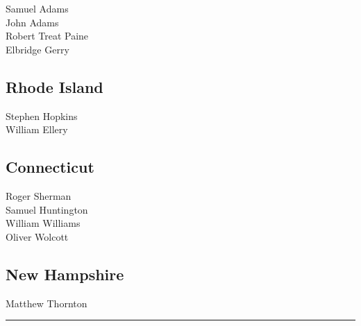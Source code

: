 \documentclass[a4paper,landscape,10pt]{article}
\begin{document}
\begin{multicols}{7}
Samuel Adams\\
John Adams\\
Robert Treat Paine\\
Elbridge Gerry


\subsection*{Rhode Island}

Stephen Hopkins\\
William Ellery



\subsection*{Connecticut}

Roger Sherman\\
Samuel Huntington\\
William Williams\\
Oliver Wolcott

\subsection*{New Hampshire}

Matthew Thornton
\end{multicols}
\nopagebreak
\hrule

{}
\end{document}
